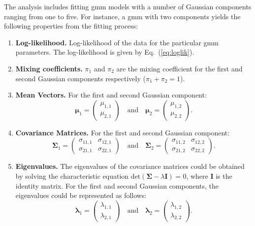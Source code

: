 The analysis includes fitting \gls{gmm} models with a number of Gaussian components ranging from one to five. For instance, a \gls{gmm} with two components yields the following properties from the fitting process:
\begin{enumerate}
    \item \textbf{Log-likelihood.} Log-likelihood of the data for the particular \gls{gmm} parameters. The log-likelihood is given by Eq.~(\ref{eq:loglik}).

    \item \textbf{Mixing coefficients.} \( \pi_1 \) and \( \pi_2 \) are the mixing coefficient for the first and second Gaussian components respectively (\( \pi_1 + \pi_2 = 1 \)).

    \item \textbf{Mean Vectors.} For the first and second Gaussian component:
    \[
    \boldsymbol{\mu}_1 = \begin{pmatrix} \mu_{1,1} \\ \mu_{2,1} \end{pmatrix} \quad \text{and} \quad 
    \boldsymbol{\mu}_2 = \begin{pmatrix} \mu_{1,2} \\ \mu_{2,2} \end{pmatrix} {.}
    \]
    
    \item \textbf{Covariance Matrices.} For the first and second Gaussian component:
    \[
    \boldsymbol{\Sigma}_1 = \begin{pmatrix} \sigma_{11,1} & \sigma_{12,1} \\ \sigma_{21,1} & \sigma_{22,1} \end{pmatrix}
    \quad \text{and} \quad
    \boldsymbol{\Sigma}_2 = \begin{pmatrix} \sigma_{11,2} & \sigma_{12,2} \\ \sigma_{21,2} & \sigma_{22,2} \end{pmatrix} {.}
    \]
    
    \item \textbf{Eigenvalues.} The eigenvalues of the covariance matrices could be obtained by solving the characteristic equation \(\text{det}(\boldsymbol{\Sigma} - \lambda \boldsymbol{I}) = 0\), where \(\boldsymbol{I}\) is the identity matrix. For the first and second Gaussian components, the eigenvalues could be represented as follows:
    \[
    \boldsymbol{\lambda}_1 = \begin{pmatrix} \lambda_{1,1} \\ \lambda_{2,1} \end{pmatrix} \quad \text{and} \quad 
    \boldsymbol{\lambda}_2 = \begin{pmatrix} \lambda_{1,2} \\ \lambda_{2,2} \end{pmatrix} {.}
    \]
\end{enumerate}

